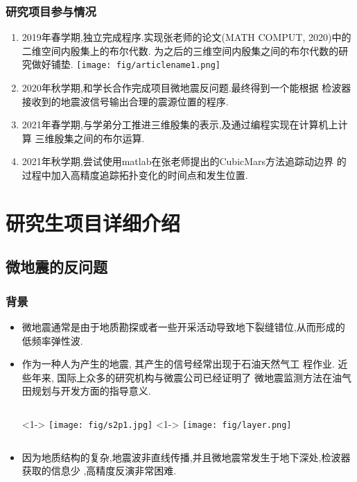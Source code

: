 \documentclass[UTF8]{ctexbeamer}	%
\theoremstyle{plain}
\theoremstyle{definition}
\theoremstyle{remark}
\numberwithin{equation}{section}
\begin{document}
\begin{frame}[fragile]
   \frametitle{研究项目参与情况}
    \small{\begin{enumerate}
        \item 2019年春学期,独立完成程序.实现张老师的论文(MATH COMPUT, 2020)中的二维空间内殷集上的布尔代数.
        为之后的三维空间内殷集之间的布尔代数的研究做好铺垫.
        \texttt{[image: fig/articlename1.png]}
        \item 2020年秋学期,和学长合作完成项目微地震反问题.最终得到一个能根据
        检波器接收到的地震波信号输出合理的震源位置的程序.
        \item 2021年春学期,与学弟分工推进三维殷集的表示,及通过编程实现在计算机上计算
        三维殷集之间的布尔运算.
        \item 2021年秋学期,尝试使用matlab在张老师提出的CubicMars方法追踪动边界
        的过程中加入高精度追踪拓扑变化的时间点和发生位置.
    \end{enumerate}}
\end{frame}

\section{研究生项目详细介绍}
\subsection{微地震的反问题}

\begin{frame}[fragile]
    \frametitle{背景}
    \begin{itemize}
        \item  微地震通常是由于地质勘探或者一些开采活动导致地下裂缝错位,从而形成的
        低频率弹性波.
        \item 作为一种人为产生的地震, 其产生的信号经常出现于石油天然气工
        程作业. 近些年来, 国际上众多的研究机构与微震公司已经证明了
        微地震监测方法在油气田规划与开发方面的指导意义.
        \begin{columns}
            <1->
                \texttt{[image: fig/s2p1.jpg]}
            <1->
            \texttt{[image: fig/layer.png]}
        \end{columns}
        \item 因为地质结构的复杂,地震波非直线传播,并且微地震常发生于地下深处,检波器获取的信息少
        ,高精度反演非常困难. 
    \end{itemize}
\end{frame}
\end{document}
